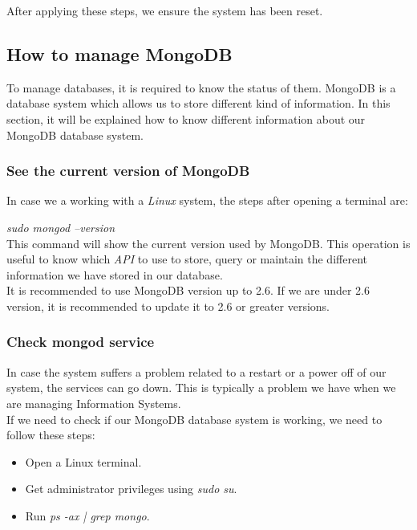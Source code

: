 After applying these steps, we ensure the system has been reset.\\

\subsection{How to manage MongoDB}

To manage databases, it is required to know the status of them. MongoDB is a database system which allows us to store different kind of information. In this section, it will be explained how to know different information about our MongoDB database system.

\subsubsection{See the current version of MongoDB}

In case we a working with a \textit{Linux} system, the steps after opening a terminal are:

\textit{sudo mongod –version}\\

This command will show the current version used by MongoDB. This operation is useful to know which \textit{API} to use to store, query or maintain the different information we have stored in our database.\\

It is recommended to use MongoDB version up to 2.6. If we are under 2.6 version, it is recommended to update it to 2.6 or greater versions.

\subsubsection{Check mongod service}

In case the system suffers a problem related to a restart or a power off of our system, the services can go down. This is typically a problem we have when we are managing Information Systems.\\

If we need to check if our MongoDB database system is working, we need to follow these steps:

\begin{itemize}
\item Open a Linux terminal.
\item Get administrator privileges using \textit{sudo su}.
\item Run \textit{ps -ax | grep mongo}.
\end{itemize}


